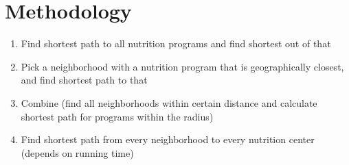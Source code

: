 \documentclass[12pt]{article}
\begin{document}
 \section{Methodology}

\begin{enumerate}
\item Find shortest path to all nutrition programs and find shortest out of that
\item Pick a neighborhood with a nutrition program that is geographically closest, and find shortest path to that
\item Combine (find all neighborhoods within certain distance and calculate shortest path for programs within the radius)
\item Find shortest path from every neighborhood to every nutrition center (depends on running time)
\end{enumerate}
\end{document}
